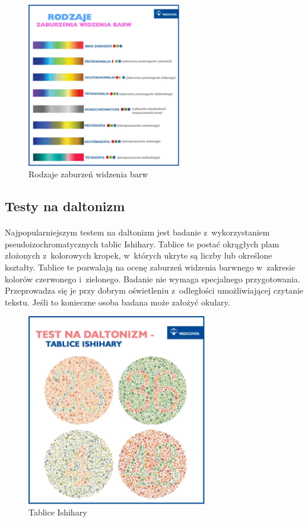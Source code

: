 \documentclass[12pt, letterpaper]{article}
\begin{document}
\begin{figure}[h]
  \centering
      \includegraphics[width=0.6\textwidth]{daltonizm_rodzaje}
  \caption{Rodzaje zaburzeń widzenia barw}
\end{figure}

\newpage

\subsection{Testy na daltonizm}
\paragraph{}
Najpopularniejszym testem na daltonizm jest badanie z~wykorzystaniem pseudoizochromatycznych tablic Ishihary. Tablice te postać okrągłych plam złożonych z~kolorowych kropek, w~których ukryte są liczby lub określone kształty. Tablice te pozwalają na ocenę zaburzeń widzenia barwnego w~zakresie kolorów czerwonego i~zielonego. Badanie nie wymaga specjalnego przygotowania. Przeprowadza się je przy dobrym oświetleniu z~odległości umożliwiającej czytanie tekstu. Jeśli to konieczne osoba badana może założyć okulary.

\begin{figure}[h]
  \centering
      \includegraphics[width=0.7\textwidth]{ishihara}
  \caption{Tablice Ishihary}
\end{figure}
\end{document}
